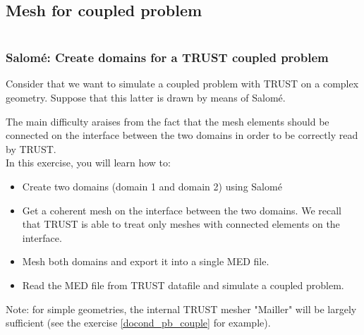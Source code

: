 \documentclass[10pt, hyperref={unicode=true,pdfusetitle, bookmarks=true,bookmarksnumbered=false,bookmarksopen=false, breaklinks=false,pdfborder={0 0 1},backref=true,colorlinks=true,linkcolor=darkblue,pageanchor}]{beamer}
\begin{document}
\subsection{Mesh for coupled problem}
\begin{frame}
\begin{small}
\begin{columns}[c] 
\tableofcontents[sections={1-9},currentsection, currentsubsection]
\tableofcontents[sections={10-16},currentsection, currentsubsection]
\end{columns}
\end{small}
\end{frame}
\begin{frame}
\frametitle{Salom\'e: Create domains for a TRUST coupled problem}
\begin{block}{}
Consider that we want to simulate a coupled problem with TRUST on a complex geometry. Suppose that this latter is drawn by means of Salom\'e.

The main difficulty araises from the fact that the mesh elements should be connected on the interface between the two domains in order to be correctly read by TRUST. \\
%
In this exercise, you will learn how to:
\begin{itemize}
\item  Create two domains (domain 1 and domain 2) using Salom\'e
\item  Get a coherent mesh on the interface between the two domains. We recall that TRUST is able to treat only meshes with connected elements on the interface.
\item  Mesh both domains and export it into a single MED file.
\item  Read the MED file from TRUST datafile and simulate a coupled problem.
\end{itemize}
%
Note: for simple geometries, the internal TRUST mesher "Mailler" will be largely sufficient (see the exercise \ref{docond_pb_couple} for example).

\end{block}
\end{frame}
\end{document}
